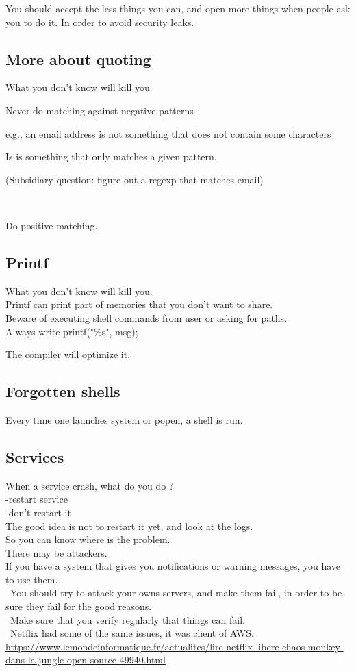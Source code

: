 \documentclass[a4paper,11pt]{article}
\begin{document}
You should accept the less things you can, and open more things when people ask you to do it. In order to avoid security leaks.

\subsection{More about quoting}

What you don't know will kill you

Never do matching against negative patterns

e.g., an email address is not something that does not contain some characters

Is is something that only matches a given pattern.

(Subsidiary question: figure out a regexp that matches email)

\

Do positive matching.

\subsection{Printf}
What you don't know will kill you.\\
Printf can print part of memories that you don't want to share.\\
Beware of executing shell commands from user or asking for paths.\\

Always write printf("\%s", msg);

The compiler will optimize it.

\subsection{Forgotten shells}

Every time one launches system or popen, a shell is run.

\subsection{Services}
When a service crash, what do you do ?\\
-restart service\\
-don't restart it\\

The good idea is not to restart it yet, and look at the logs.\\
So you can know where is the problem.\\
There may be attackers.\\

If you  have a system that gives you notifications or warning messages, you have to use them.\\
\
You should try to attack your owns servers, and make them fail, in order to be sure they fail for the good reasons.\\
\
Make sure that you verify regularly that things can fail.\\
\
Netflix had some of the same issues, it was client of AWS.\\
\url{https://www.lemondeinformatique.fr/actualites/lire-netflix-libere-chaos-monkey-dans-la-jungle-open-source-49940.html}
\end{document}
